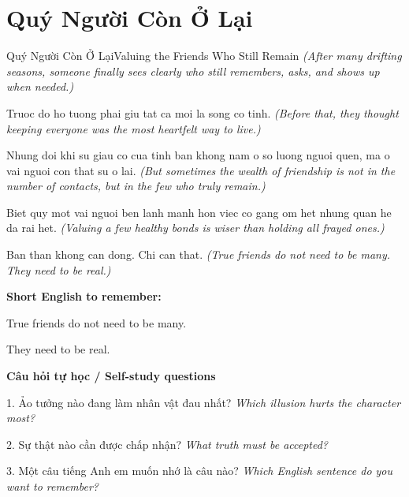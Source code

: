 \section{Quý Người Còn Ở Lại}
\begin{truyen}{Quý Người Còn Ở Lại}{Valuing the Friends Who Still Remain}
\textit{(After many drifting seasons, someone finally sees clearly who still remembers, asks, and shows up when needed.)}

Truoc do ho tuong phai giu tat ca moi la song co tinh.
\textit{(Before that, they thought keeping everyone was the most heartfelt way to live.)}

Nhung doi khi su giau co cua tinh ban khong nam o so luong nguoi quen, ma o vai nguoi con that su o lai.
\textit{(But sometimes the wealth of friendship is not in the number of contacts, but in the few who truly remain.)}

Biet quy mot vai nguoi ben lanh manh hon viec co gang om het nhung quan he da rai het.
\textit{(Valuing a few healthy bonds is wiser than holding all frayed ones.)}

\end{truyen}

\begin{baihoc}
Ban than khong can dong. Chi can that.
\textit{(True friends do not need to be many. They need to be real.)}
\end{baihoc}

\begin{ghinhoanh}
\textbf{Short English to remember:}

True friends do not need to be many.

They need to be real.

\end{ghinhoanh}

\begin{tuhocnhanh}
\textbf{Câu hỏi tự học / Self-study questions}

1. Ảo tưởng nào đang làm nhân vật đau nhất? \textit{Which illusion hurts the character most?}

2. Sự thật nào cần được chấp nhận? \textit{What truth must be accepted?}

3. Một câu tiếng Anh em muốn nhớ là câu nào? \textit{Which English sentence do you want to remember?}
\end{tuhocnhanh}

